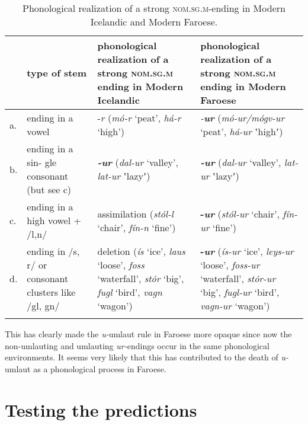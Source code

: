 \documentclass[output=paper,
modfonts
]{LSP/langsci}
\begin{document}
\begin{exe}
\begin{table}
	\begin{tabularx}{\textwidth}{@{}l>{\raggedright}p{1in}>{\raggedright}X>{\raggedright}X@{}}
		\lsptoprule
& type of stem & phonological realization of a strong \textsc{nom.sg.m} ending in Modern Icelandic & phonological
realization of a strong \textsc{nom.sg.m} ending in Modern
Faroese\tabularnewline
\midrule
a. & ending in a vowel & -\emph{r} \newline (\emph{mó-r} `peat', \emph{há-r}
`high') & \emph{-\textbf{ur}} \newline (\emph{mó-ur/mógv-ur} `peat', \emph{há-ur}
ʽhighʼ)\tabularnewline
b. & ending in a sin- gle consonant (but see c) & \emph{\textbf{-ur}} \newline
(\emph{dal-ur} `valley', \emph{lat-ur} ʽlazyʼ) & \emph{\textbf{-ur}} \newline
(\emph{dal-ur} `valley', \emph{lat-ur} ʽlazyʼ)\tabularnewline
c. & ending in a high vowel + /l,n/ & assimilation \newline (\emph{stól-l} `chair',
\emph{fín-n} `fine') & \textbf{-\emph{ur}} \newline (\emph{stól-ur} `chair',
\emph{fín-ur} `fine')\tabularnewline
d. & ending in /s, r/ or consonant clusters like /gl, gn/ & deletion \newline
(\emph{ís} `ice', \emph{laus} `loose', \emph{foss} `waterfall',
\emph{stór} `big', \emph{fugl} `bird', \emph{vagn} `wagon') &
\textbf{-\emph{ur}} \newline (\emph{ís-ur} `ice', \emph{leys-ur} `loose',
\emph{foss-ur} `waterfall', \emph{stór-ur} `big', \emph{fugl-ur} `bird',
\emph{vagn-ur} `wagon')\tabularnewline
	\lspbottomrule
	\end{tabularx}
\caption{Phonological realization of a strong \textsc{nom.sg.m}-ending in Modern Icelandic and Modern Faroese.}
\label{tab:strong}
\end{table}

This has clearly made the \emph{u-}umlaut rule in Faroese more opaque
since now the non-umlauting and umlauting \emph{ur-}endings occur in the
same phonological environments. It seems very likely that this has
contributed to the death of \emph{u-}umlaut as a phonological process in
Faroese.

\section{Testing the predictions}\label{testing-the-predictions}


\end{exe}
\end{document}
